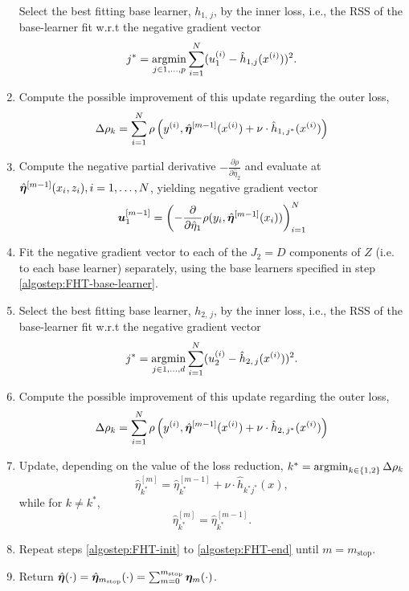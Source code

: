 \begin{enumerate}
        Select the best fitting base learner, $h_{1,\,j}$, by the inner loss,
        i.e., the RSS of the base-learner fit w.r.t the negative gradient vector
        \begin{equation}
            j^*=\operatorname*{argmin}_{j\in 1,\ldots,p}\sum_{i=1}^N(u_1^{(i)}-\hat{h}_{1,j}(x^{(i)}))^2.
        \end{equation}
    \item
        Compute the possible improvement of this update regarding the outer loss,
        \begin{equation}
            \Delta\rho_k=\sum_{i=1}^N\rho\left(y^{(i)}, \hat{\boldsymbol{\eta}}^{[m-1]}(x^{(i)}) + \nu \cdot \hat{h}_{1,\,j^*}(x^{(i)}) \right)
        \end{equation}
    \item
        Compute the negative partial derivative $-\frac{\partial\rho}{\partial \hat{\eta}_2}$
        and evaluate at $\hat{\boldsymbol{\eta}}^{[m-1]}(x_i,z_i),i=1,\ldots,N$, yielding negative gradient vector
        \begin{equation}
            \bm{u}^{[m-1]}_1=\left(-\frac{\partial}{\partial \hat{\eta}_1}\rho(y_i, \hat{\boldsymbol{\eta}}^{[m-1]}(x_i))\right)_{i=1}^N
        \end{equation}
    \item
        Fit the negative gradient vector to each of the $J_2=D$ components of $Z$ (i.e. to each base learner) separately, using the base learners specified in step \ref{algostep:FHT-base-learner}.
    \item
        Select the best fitting base learner, $h_{2,\,j}$, by the inner loss,
        i.e., the RSS of the base-learner fit w.r.t the negative gradient vector
        \begin{equation}
            j^*=\operatorname*{argmin}_{j\in 1,\ldots,d}\sum_{i=1}^N(u_2^{(i)}-\hat{h}_{2,\,j}(x^{(i)}))^2.
        \end{equation}
    \item
        Compute the possible improvement of this update regarding the outer loss,
        \begin{equation}
            \Delta\rho_k=\sum_{i=1}^N\rho\left(y^{(i)}, \hat{\boldsymbol{\eta}}^{[m-1]}(x^{(i)}) + \nu \cdot \hat{h}_{2,\,j^*}(x^{(i)}) \right)
        \end{equation}
    \item
    \label{algostep:FHT-end}
        Update, depending on the value of the loss reduction, $k^*=\operatorname*{argmin}_{k\in\{1,2\}}\Delta\rho_k$
        \begin{equation}
            \hat{\eta}^{[m]}_{k^*}=\hat{\eta}^{[m-1]}_{k^*}+\nu\cdot\hat{h}_{k^*j^*}(x),
        \end{equation}
        while for $k\neq k^*$,
        \begin{equation}
            \hat{\eta}^{[m]}_{k^*}=\hat{\eta}^{[m-1]}_{k^*}.
        \end{equation}
    \item Repeat steps \ref{algostep:FHT-init} to \ref{algostep:FHT-end} until $m=m_{\text{stop}}$.
    \item Return $\hat{\boldsymbol{\eta}}(\cdot)=\hat{\boldsymbol{\eta}}_{m_{\text{stop}}}(\cdot)=\sum_{m=0}^{m_{\text{stop}}}\boldsymbol{\eta}_m(\cdot)$.
\end{enumerate}
